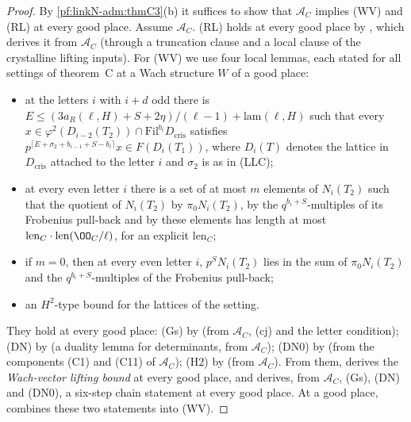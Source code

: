 \begin{proof}
By \cref{pf:linkN-adm:thmC3}(b) it suffices to show that $\mathcal A_C$ implies (WV) and (RL) at every good place. Assume
$\mathcal A_C$. (RL) holds at every good place by
, which derives it from $\mathcal A_C$ (through a
truncation clause and a local clause of the crystalline lifting inputs). For (WV) we use four local lemmas, each stated
for all settings of theorem~C at a Wach structure $W$ of a good place:
\begin{itemize}
\item[(Gs)] at the letters $i$ with $i+d$ odd there is $E\le(3a_R(\ell,H)+S+2\eta)/(\ell-1)+\mathrm{lam}(\ell,H)$ such that
  every $x\in\varphi^2(D_{i-2}(T_2))\cap\mathrm{Fil}^{b_i}D_{\mathrm{cris}}$ satisfies
  $p^{\lceil E+\sigma_2+b_{i-1}+S-b_i\rceil}x\in F(D_i(T_1))$, where $D_i(T)$ denotes the lattice in $D_{\mathrm{cris}}$
  attached to the letter $i$ and $\sigma_2$ is as in (LLC);
\item[(DN)] at every even letter $i$ there is a set of at most $m$ elements of $N_i(T_2)$ such that the quotient of $N_i(T_2)$
  by $\pi_0N_i(T_2)$, by the $q^{b_i+S}$-multiples of its Frobenius pull-back and by these elements has length at most
  $\mathrm{len}_C\cdot\linkNadmlen(\OO_C/\ell)$, for an explicit $\mathrm{len}_C$;
\item[(DN0)] if $m=0$, then at every even letter $i$, $p^S N_i(T_2)$ lies in the sum of $\pi_0N_i(T_2)$ and the
  $q^{b_i+S}$-multiples of the Frobenius pull-back;
\item[(H2)] an $H^2$-type bound for the lattices of the setting.
\end{itemize}
They hold at every good place: (Gs) by  (from
$\mathcal A_C$, (cj) and the letter condition); (DN) by
 (a
duality lemma for determinants, from $\mathcal A_C$); (DN0) by
 (from the components (C1) and (C11) of
$\mathcal A_C$); (H2) by  (from $\mathcal
A_C$). From them,  derives the
\emph{Wach-vector lifting bound} at every good place, and 
derives, from $\mathcal A_C$, (Gs), (DN) and (DN0), a six-step chain statement at every good place. At a good place,
 combines these two statements into
(WV).
\end{proof}

